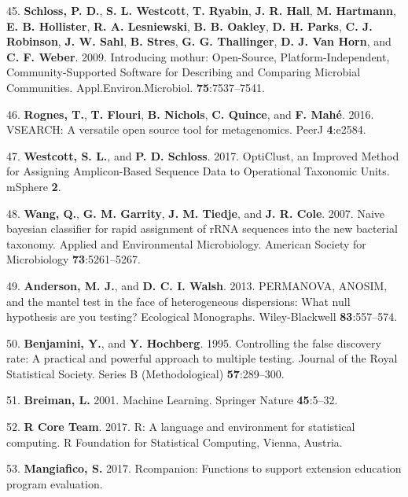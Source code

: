 \documentclass[12pt,]{article}
\begin{document}
\hypertarget{ref-schloss_introducing_2009}{}
45. \textbf{Schloss, P. D.}, \textbf{S. L. Westcott}, \textbf{T.
Ryabin}, \textbf{J. R. Hall}, \textbf{M. Hartmann}, \textbf{E. B.
Hollister}, \textbf{R. A. Lesniewski}, \textbf{B. B. Oakley}, \textbf{D.
H. Parks}, \textbf{C. J. Robinson}, \textbf{J. W. Sahl}, \textbf{B.
Stres}, \textbf{G. G. Thallinger}, \textbf{D. J. Van Horn}, and
\textbf{C. F. Weber}. 2009. Introducing mothur: Open-Source,
Platform-Independent, Community-Supported Software for Describing and
Comparing Microbial Communities. Appl.Environ.Microbiol.
\textbf{75}:7537--7541.

\hypertarget{ref-rognes_vsearch_2016}{}
46. \textbf{Rognes, T.}, \textbf{T. Flouri}, \textbf{B. Nichols},
\textbf{C. Quince}, and \textbf{F. Mahé}. 2016. VSEARCH: A versatile
open source tool for metagenomics. PeerJ \textbf{4}:e2584.

\hypertarget{ref-westcott_opticlust_2017}{}
47. \textbf{Westcott, S. L.}, and \textbf{P. D. Schloss}. 2017.
OptiClust, an Improved Method for Assigning Amplicon-Based Sequence Data
to Operational Taxonomic Units. mSphere \textbf{2}.

\hypertarget{ref-rdp_Wang2007}{}
48. \textbf{Wang, Q.}, \textbf{G. M. Garrity}, \textbf{J. M. Tiedje},
and \textbf{J. R. Cole}. 2007. Naive bayesian classifier for rapid
assignment of rRNA sequences into the new bacterial taxonomy. Applied
and Environmental Microbiology. American Society for Microbiology
\textbf{73}:5261--5267.

\hypertarget{ref-permanova_Anderson2013}{}
49. \textbf{Anderson, M. J.}, and \textbf{D. C. I. Walsh}. 2013.
PERMANOVA, ANOSIM, and the mantel test in the face of heterogeneous
dispersions: What null hypothesis are you testing? Ecological
Monographs. Wiley-Blackwell \textbf{83}:557--574.

\hypertarget{ref-benjamini_controlling_1995}{}
50. \textbf{Benjamini, Y.}, and \textbf{Y. Hochberg}. 1995. Controlling
the false discovery rate: A practical and powerful approach to multiple
testing. Journal of the Royal Statistical Society. Series B
(Methodological) \textbf{57}:289--300.

\hypertarget{ref-Breiman2001}{}
51. \textbf{Breiman, L.} 2001. Machine Learning. Springer Nature
\textbf{45}:5--32.

\hypertarget{ref-r_citation_2017}{}
52. \textbf{R Core Team}. 2017. R: A language and environment for
statistical computing. R Foundation for Statistical Computing, Vienna,
Austria.

\hypertarget{ref-rcompanion_citation_2017}{}
53. \textbf{Mangiafico, S.} 2017. Rcompanion: Functions to support
extension education program evaluation.
\end{document}
